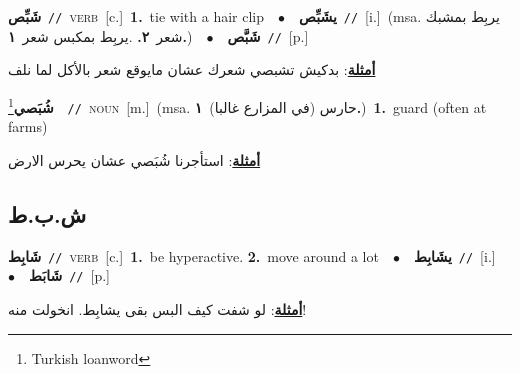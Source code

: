 \documentclass[10pt,a4paper,twoside]{article} %
\begin{document}
\begin{multicols}{2}
{{{{{{{{{{{\setlength\topsep{0pt}\textbf{\foreignlanguage{arabic}{شَبِّص}}\ {\color{gray}\texttt{//}\color{black}}\ \textsc{verb}\ [c.]\ \textbf{1.}~tie with a hair clip\ \ $\bullet$\ \ \setlength\topsep{0pt}\textbf{\foreignlanguage{arabic}{يشَبِّص}}\ {\color{gray}\texttt{//}\color{black}}\ [i.]\ \color{gray}(msa. \foreignlanguage{arabic}{يربِط بمشبك شعر}~\foreignlanguage{arabic}{\textbf{٢.}}  .\foreignlanguage{arabic}{يربِط بمكبس شعر}~\foreignlanguage{arabic}{\textbf{١.}})\color{black}\ \ $\bullet$\ \ \setlength\topsep{0pt}\textbf{\foreignlanguage{arabic}{شَبَّص}}\ {\color{gray}\texttt{//}\color{black}}\ [p.]\  \begin{flushright}\color{gray}\foreignlanguage{arabic}{\textbf{\underline{\foreignlanguage{arabic}{أمثلة}}}: بدكيش تشبصي شعرك عشان مايوقع شعر بالأكل لما نلف}\end{flushright}\color{black}} \vspace{2mm}

{\setlength\topsep{0pt}\textbf{\foreignlanguage{arabic}{شُبَصي}}\footnote{Turkish loanword}\ \ {\color{gray}\texttt{//}\color{black}}\ \textsc{noun}\ [m.]\ \color{gray}(msa. \foreignlanguage{arabic}{حارس (في المزارع غالبا)}~\foreignlanguage{arabic}{\textbf{١.}})\color{black}\ \textbf{1.}~guard (often at farms)\  \begin{flushright}\color{gray}\foreignlanguage{arabic}{\textbf{\underline{\foreignlanguage{arabic}{أمثلة}}}: استأجرنا شُبَصي عشان يحرس الارض}\end{flushright}\color{black}} \vspace{2mm}

\vspace{-3mm}
\subsection*{\color{blue}\foreignlanguage{arabic}{ش.ب.ط}\color{blue}{}} 

{\setlength\topsep{0pt}\textbf{\foreignlanguage{arabic}{شَابِط}}\ {\color{gray}\texttt{//}\color{black}}\ \textsc{verb}\ [c.]\ \textbf{1.}~be hyperactive.  \textbf{2.}~move around a lot\ \ $\bullet$\ \ \setlength\topsep{0pt}\textbf{\foreignlanguage{arabic}{يشَابِط}}\ {\color{gray}\texttt{//}\color{black}}\ [i.]\ \ $\bullet$\ \ \setlength\topsep{0pt}\textbf{\foreignlanguage{arabic}{شَابَط}}\ {\color{gray}\texttt{//}\color{black}}\ [p.]\  \begin{flushright}\color{gray}\foreignlanguage{arabic}{\textbf{\underline{\foreignlanguage{arabic}{أمثلة}}}: لو شفت كيف البس بقى يشابِط. انخولت منه!}\end{flushright}\color{black}} \vspace{2mm}

}}}}}}}}}}
\end{multicols}
\end{document}
